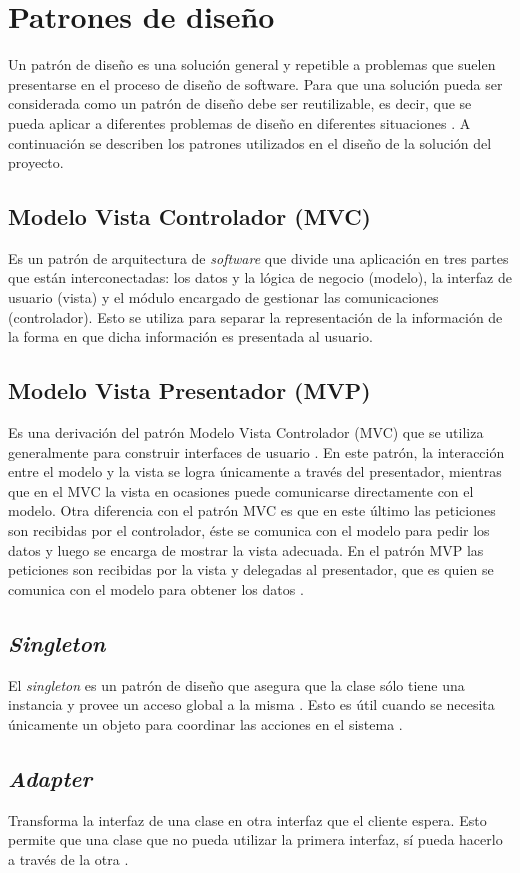 \section{Patrones de diseño} \label{sect:Patrones de diseno}

Un patrón de diseño es una solución general y repetible a problemas que suelen presentarse en el proceso de diseño de software. Para que una solución pueda ser considerada como un patrón de diseño debe ser reutilizable, es decir, que se pueda aplicar a diferentes problemas de diseño en diferentes situaciones \cite{DSP0}. A continuación se describen los patrones utilizados en el diseño de la solución del proyecto.

\subsection{Modelo Vista Controlador (MVC)}

Es un patrón de arquitectura de \textit{software} que divide una aplicación  en tres partes que están interconectadas: los datos y la lógica de negocio (modelo), la interfaz de usuario (vista) y el módulo encargado de gestionar las comunicaciones (controlador). Esto se utiliza para separar la representación de la información de la forma en que dicha información es presentada al usuario.

\subsection{Modelo Vista Presentador (MVP)}

Es una derivación del patrón Modelo Vista Controlador (MVC) que se utiliza generalmente para construir interfaces de usuario \cite{MVP0}. En este patrón, la interacción entre el modelo y la vista se logra únicamente a través del presentador, mientras que en el MVC la vista en ocasiones puede comunicarse directamente con el modelo. Otra diferencia con el patrón MVC es que en este último las peticiones son recibidas por el controlador, éste se comunica con el modelo para pedir los datos y luego se encarga de mostrar la vista adecuada. En el patrón MVP las peticiones son recibidas por la vista y delegadas al presentador, que es quien se comunica con el modelo para obtener los datos \cite{MVP1}.

\subsection{\textit{Singleton}}

El \textit{singleton} es un patrón de diseño que asegura que la clase sólo tiene una instancia y provee un acceso global a la misma \cite{DSP1}. Esto es útil cuando se necesita únicamente un objeto para coordinar las acciones en el sistema \cite{SNG0}.

\subsection{\textit{Adapter}}

Transforma la interfaz de una clase en otra interfaz que el cliente espera. Esto permite que una clase que no pueda utilizar la primera interfaz, sí pueda hacerlo a través de la otra \cite{DSP1}. 

